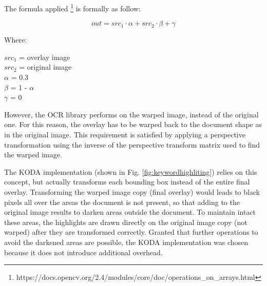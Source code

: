 \documentclass[a4paper]{article}
\begin{document}
The formula applied \footnote{https://docs.opencv.org/2.4/modules/core/doc/operations\_on\_arrays.html} is formally as follow: %

\begin{equation}
	out = src_1 \cdot \alpha + src_2 \cdot \beta + \gamma
\end{equation}

Where:

\begin{center}
	$src_1$ = overlay image \\
	$src_2$ = original image \\
	$\alpha$ = 0.3  \\
	$\beta$ = 1 - $\alpha$ \\
	$\gamma$ = 0 
\end{center}

However, the OCR library performs on the warped image, instead of the original one. For this reason, the overlay has to be warped back to the document shape as in the original image. This requirement is satisfied by applying a perspective transformation using the inverse of the perspective transform matrix used to find the warped image. 

The KODA implementation (shown in Fig. \ref{fig:keywordhighliting}) relies on this concept, but actually transforms each bounding box instead of the entire final overlay. Transforming the warped image copy (final overlay) would leads to black pixels all over the areas the document is not present, so that adding to the original image results to darken areas outside the document. To maintain intact these areas, the highlights are drawn directly on the original image copy (not warped) after they are transformed correctly. Granted that further operations to avoid the darkened areas are possible, the KODA implementation was chosen because it does not introduce additional overhead.
\end{document}
